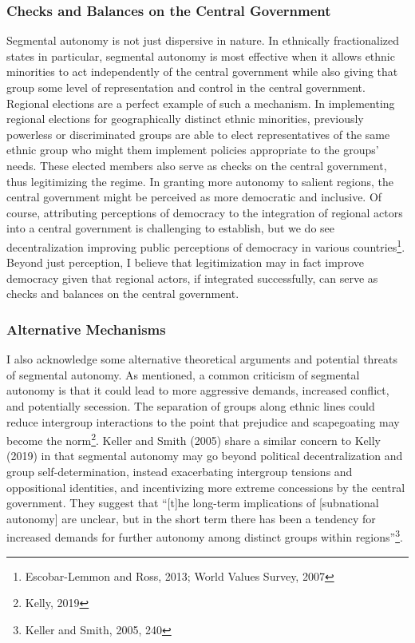 \documentclass[12pt]{article}
\begin{document}
\subsubsection{Checks and Balances on the Central Government}
Segmental autonomy is not just dispersive in nature. In ethnically fractionalized states in particular, segmental autonomy is most effective when it allows ethnic minorities to act independently of the central government while also giving that group some level of representation and control in the central government. Regional elections are a perfect example of such a mechanism. In implementing regional elections for geographically distinct ethnic minorities, previously powerless or discriminated groups are able to elect representatives of the same ethnic group who might them implement policies appropriate to the groups' needs. These elected members also serve as checks on the central government, thus legitimizing the regime. In granting more autonomy to salient regions, the central government might be perceived as more democratic and inclusive. Of course, attributing perceptions of democracy to the integration of regional actors into a central government is challenging to establish, but we do see decentralization improving public perceptions of democracy in various countries\footnote{Escobar-Lemmon and Ross, 2013; World Values Survey, 2007}. Beyond just perception, I believe that legitimization may in fact improve democracy given that regional actors, if integrated successfully, can serve as checks and balances on the central government.

\subsubsection{Alternative Mechanisms}
I also acknowledge some alternative theoretical arguments and potential threats of segmental autonomy. As mentioned, a common criticism of segmental autonomy is that it could lead to more aggressive demands, increased conflict, and potentially secession. The separation of groups along ethnic lines could reduce intergroup interactions to the point that prejudice and scapegoating may become the norm\footnote{Kelly, 2019}. Keller and Smith (2005) share a similar concern to Kelly (2019) in that segmental autonomy may go beyond political decentralization and group self-determination, instead exacerbating intergroup tensions and oppositional identities, and incentivizing more extreme concessions by the central government. They suggest that ``[t]he long-term implications of [subnational autonomy] are unclear, but in the short term there has been a tendency for increased demands for further autonomy among distinct groups within regions''\footnote{Keller and Smith, 2005, 240}. 
\end{document}
